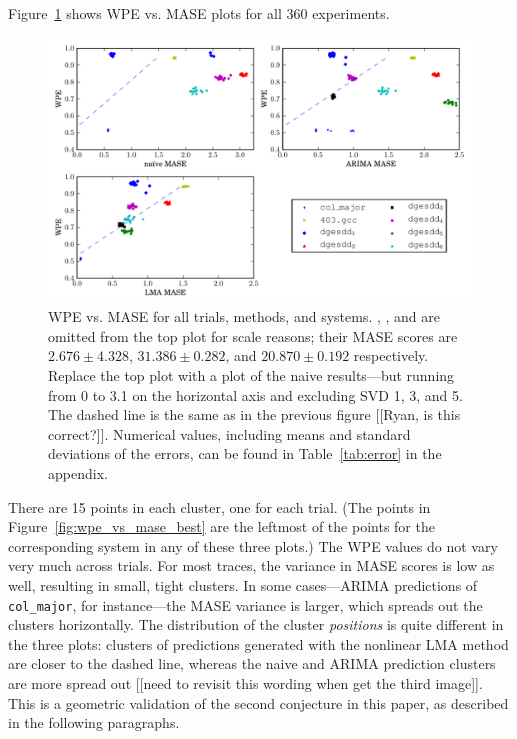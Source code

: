 Figure~\ref{fig:wpe_vs_mase_all} shows WPE vs. MASE plots for all 360
experiments.
\begin{figure}
  \centering
  \includegraphics[width=\columnwidth]{figs/predictions_vs_entropy}
\caption{WPE vs. MASE for all trials, methods, and systems.  \svdone,
  \svdthree, and \svdfive are omitted from the top plot for scale
  reasons; their MASE scores are $2.676 \pm 4.328$, $31.386 \pm
  0.282$, and $20.870 \pm 0.192$ respectively.  {\color{red}Replace
    the top plot with a plot of the naive results---but running from 0
    to 3.1 on the horizontal axis and excluding SVD 1, 3, and 5}.  The
  dashed line is the same as in the previous figure [[Ryan, is this
      correct?]].  Numerical values, including means and standard
  deviations of the errors, can be found in Table~\ref{tab:error} in
  the appendix.
% 
% 
}
    \label{fig:wpe_vs_mase_all}
\end{figure} 
There are 15 points in each cluster, one for each trial.  (The points
in Figure~\ref{fig:wpe_vs_mase_best} are the leftmost of the points
for the corresponding system in any of these three plots.)  The WPE
values do not vary very much across trials.  For most traces, the
variance in MASE scores is low as well, resulting in small, tight
clusters.  In some cases---ARIMA predictions of {\tt col\_major}, for
instance---the MASE variance is larger, which spreads out the clusters
horizontally.  The distribution of the cluster {\sl positions} is
quite different in the three plots: clusters of predictions generated
with the nonlinear LMA method are closer to the dashed line, whereas
the naive and ARIMA prediction clusters are more spread out [[need to
    revisit this wording when get the third image]].  This is a
geometric validation of the second conjecture in this paper, as
described in the following paragraphs.

